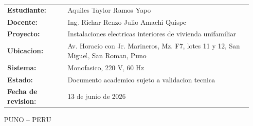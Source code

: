 \begin{titlepage}
\begin{minipage}{5.20in}
\vspace{0.40in}
\begin{flushleft}
\fontsize{10}{13}\selectfont
\renewcommand{\arraystretch}{1.23}
\begin{tabular}{>{\bfseries}p{1.75in}p{3.15in}}
Estudiante: & Aquiles Taylor Ramos Yapo \\
Docente: & Ing. Richar Renzo Julio Amachi Quispe \\
Proyecto: & Instalaciones electricas interiores de vivienda unifamiliar \\
Ubicacion: & Av. Horacio con Jr. Marineros, Mz. F7, lotes 11 y 12, San Miguel, San Roman, Puno \\
Sistema: & Monofasico, 220 V, 60 Hz \\
Estado: & Documento academico sujeto a validacion tecnica \\
Fecha de revision: & 13 de junio de 2026 \\
\end{tabular}
\end{flushleft}

\vfill
{\fontsize{10}{12}\selectfont PUNO -- PERU\par}
{\fontsize{9}{11}\par}
\end{minipage}

\end{titlepage}
